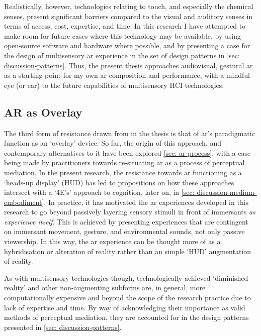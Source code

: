 Realistically, however, technologies relating to touch, and especially the chemical senses, present significant barriers compared to the visual and auditory senses in terms of access, cost, expertise, and time. In this research I have attempted to make room for future cases where this technology may be available, by using open-source software and hardware where possible, and by presenting a case for the design of multisensory \gls{ar} experience in the set of design patterns in \autoref{sec: discussion-patterns}. Thus, the present thesis approaches audiovisual, gestural \gls{ar} as a starting point for my own \gls{ar} composition and performance, with a mindful eye (or ear) to the future capabilities of multisensory HCI technologies.

\subsection{AR as Overlay}\label{sec: method-resistance-overlay}
The third form of resistance drawn from in the thesis is that of \gls{ar}'s paradigmatic function as an `overlay' device. So far, the origin of this approach, and contemporary alternatives to it have been explored \autoref{sec: ar-process}, with a case being made by practitioners \citep{mann1994,schraffenberger2018,chevalier2020} towards re-situating \gls{ar} as a process of perceptual mediation. In the present research, the resistance towards \gls{ar} functioning as a `heads-up display' (HUD) has led to propositions on how these approaches intersect with a `4E's' approach to cognition, later on, in \autoref{sec: discussion-medium-embodiment}. In practice, it has motivated the \gls{ar} experiences developed in this research to go beyond passively layering sensory stimuli in front of immersants \textit{as experience itself}. This is achieved by presenting experiences that are contingent on immersant movement, gesture, and environmental sounds, not only passive viewership. In this way, the \gls{ar} experience can be thought more of as a hybridisation or alteration of reality rather than an simple `HUD' augmentation of reality.

As with multisensory technologies though, technologically achieved `diminished reality' and other non-augmenting subforms are, in general, more computationally expensive and beyond the scope of the research practice due to lack of expertise and time. By way of acknowledging their importance as valid methods of perceptual mediation, they are accounted for in the design patterns presented in \autoref{sec: discussion-patterns}.



